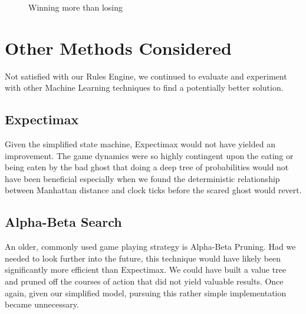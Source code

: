 \documentclass[11pt, oneside]{article}   	%
\begin{document}
\begin{figure}[h!]
  \centering
  \caption{Winning more than losing}
  \label{fig:3dscore}
 \end{figure}

\section{Other Methods Considered}

Not satisfied with our Rules Engine, we continued to evaluate and experiment with other Machine Learning techniques to find a potentially better solution.

\subsection{Expectimax}

Given the simplified state machine, Expectimax would not have yielded an improvement. The game dynamics were so highly contingent upon the eating or being eaten by the bad ghost that doing a deep tree of probabilities would not have been beneficial especially when we found the deterministic relationship between Manhattan distance and clock ticks before the scared ghost would revert.

\subsection{Alpha-Beta Search}

An older, commonly used game playing strategy is Alpha-Beta Pruning.\cite{russell} Had we needed to look further into the future, this technique would have likely been significantly more efficient than Expectimax. We could have built a value tree and pruned off the courses of action that did not yield valuable results. Once again, given our simplified model, pursuing this rather simple implementation became unnecessary.
\end{document}
